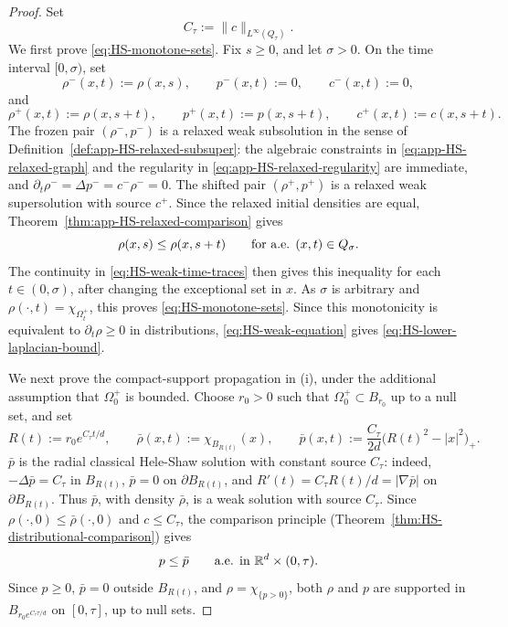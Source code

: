 \documentclass[11pt]{amsart}
\numberwithin{equation}{section}
\numberwithin{figure}{section}
\theoremstyle{plain}
\theoremstyle{definition}
\theoremstyle{remark}
\theoremstyle{plain}
\newcommand{\abs}[1]{\lvert #1 \rvert}
\newcommand{\norm}[1]{\lVert #1 \rVert}
\def\R{\mathbb{R}}
\begin{document}
\begin{proof}
Set
\[
    C_\tau:=\norm{c}_{L^\infty(Q_{\tau})}.
\]
We first prove \eqref{eq:HS-monotone-sets}.  Fix \(s\geq0\), and let
\(\sigma>0\).  On the time interval \([0,\sigma)\), set
\[
    \rho^-(x,t):=\rho(x,s),\qquad p^-(x,t):=0,\qquad c^-(x,t):=0,
\]
and
\[
    \rho^+(x,t):=\rho(x,s+t),\qquad
    p^+(x,t):=p(x,s+t),\qquad
    c^+(x,t):=c(x,s+t).
\]
The frozen pair \((\rho^-,p^-)\) is a relaxed weak subsolution in the sense of
Definition~\ref{def:app-HS-relaxed-subsuper}: the algebraic constraints in
\eqref{eq:app-HS-relaxed-graph} and the regularity in
\eqref{eq:app-HS-relaxed-regularity} are immediate, and
\(\partial_t\rho^-=\Delta p^-=c^-\rho^-=0\).
The shifted pair \((\rho^+,p^+)\) is a relaxed weak supersolution with source
\(c^+\).  Since the relaxed initial densities are equal,
Theorem~\ref{thm:app-HS-relaxed-comparison} gives
\[
    \rho(x,s)\leq\rho(x,s+t)
    \qquad\hbox{for a.e. }(x,t)\in Q_{\sigma}.
\]
  The continuity in \eqref{eq:HS-weak-time-traces} then gives this
inequality for each \(t\in(0,\sigma)\), after changing the exceptional set in
\(x\).  As
\(\sigma\) is arbitrary and \(\rho(\cdot,t)=\chi_{\Omega_t^{+}}\), this proves
\eqref{eq:HS-monotone-sets}.  Since this monotonicity is equivalent to
\(\partial_t\rho\geq0\) in distributions, \eqref{eq:HS-weak-equation} gives
\eqref{eq:HS-lower-laplacian-bound}.

We next prove the compact-support propagation in (i), under the additional
assumption that \(\Omega_0^{+}\) is bounded.  Choose \(r_0>0\) such that
\(\Omega_0^{+}\subset B_{r_0}\) up to a null set, and set
\begin{equation}\label{eq:HS-compact-support-barrier}
    R(t):=r_0e^{C_\tau t/d},\qquad
    \bar\rho(x,t):=\chi_{B_{R(t)}}(x),\qquad
    \bar p(x,t):=\frac{C_\tau}{2d}\bigl(R(t)^2-\abs{x}^2\bigr)_+ .
\end{equation}
\(\bar p\) is the radial classical Hele-Shaw solution with constant source
\(C_\tau\): indeed,
\(-\Delta\bar p=C_\tau\) in \(B_{R(t)}\), \(\bar p=0\) on
\(\partial B_{R(t)}\), and
\(R'(t)=C_\tau R(t)/d=\abs{\nabla\bar p}\) on \(\partial B_{R(t)}\).
Thus \(\bar p\), with density \(\bar\rho\), is a weak solution with source
\(C_\tau\).  Since
\(\rho(\cdot,0)\leq\bar\rho(\cdot,0)\) and \(c\leq C_\tau\), the comparison
principle (Theorem~\ref{thm:HS-distributional-comparison}) gives
\begin{equation}\label{eq:HS-compact-support-comparison}
    p\leq\bar p
    \qquad\hbox{a.e. in }\R^d\times(0,\tau).
\end{equation}
Since \(p\geq0\), \(\bar p=0\) outside \(B_{R(t)}\), and
\(\rho=\chi_{\{p>0\}}\), both \(\rho\) and \(p\) are supported in
\(B_{r_0e^{C_\tau\tau/d}}\) on \([0,\tau]\), up to null sets.


\end{proof}
\end{document}
